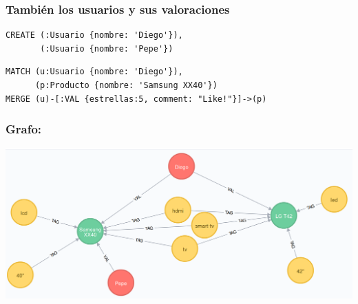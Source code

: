 \documentclass[14pt]{beamer}
\begin{document}
\begin{frame}
  \frametitle{También los usuarios y sus valoraciones}
\begin{lstlisting}[language=cypher]
CREATE (:Usuario {nombre: 'Diego'}),
       (:Usuario {nombre: 'Pepe'})
\end{lstlisting}

\begin{lstlisting}[language=cypher]
MATCH (u:Usuario {nombre: 'Diego'}),
      (p:Producto {nombre: 'Samsung XX40'})
MERGE (u)-[:VAL {estrellas:5, comment: "Like!"}]->(p)
\end{lstlisting}

\end{frame}

\begin{frame}
  \frametitle{Grafo:}
  \includegraphics[width=\textwidth]{img/neo4j2}
\end{frame}
\end{document}
